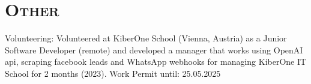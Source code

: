 \section{\textsc{Other}}


Volunteering: Volunteered at KiberOne School (Vienna, Austria) as a Junior Software Developer (remote) and developed a manager that works using OpenAI api, scraping facebook leads and WhatsApp webhooks for managing KiberOne IT School for 2 months (2023).
Work Permit until: 25.05.2025


